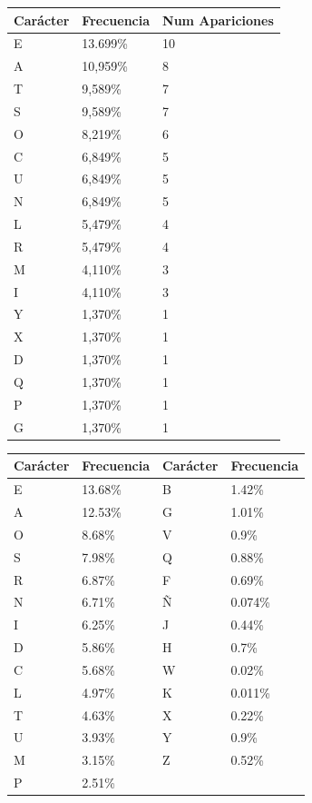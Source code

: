 \documentclass{article}
\begin{document}
\begin{enumerate}
\begin{tabular}{|l|l|l|}
\hline 
Carácter & Frecuencia & Num Apariciones \\ \hline 
E & 13.699\% & 10 \\ \hline
A & 10,959\% & 8 \\ \hline
T & 9,589\% & 7 \\ \hline
S & 9,589\% & 7 \\ \hline
O & 8,219\% & 6 \\ \hline
C & 6,849\% & 5 \\ \hline
U & 6,849\% & 5 \\ \hline
N & 6,849\% & 5 \\ \hline
L & 5,479\% & 4 \\ \hline
R & 5,479\% & 4 \\ \hline
M & 4,110\% & 3 \\ \hline
I & 4,110\% & 3 \\ \hline
Y & 1,370\% & 1 \\ \hline
X & 1,370\% & 1 \\ \hline
D & 1,370\% & 1 \\ \hline
Q & 1,370\% & 1 \\ \hline
P & 1,370\% & 1 \\ \hline
G & 1,370\% & 1 \\ 
\hline
\end{tabular}
\label{tabla:sencilla}



\begin{tabular}{|l|l|l|l|}
\hline 
Carácter & Frecuencia & Carácter & Frecuencia \\ \hline
E & 13.68\% & B & 1.42\% \\ \hline
A & 12.53\% & G & 1.01\% \\ \hline
O & 8.68\% & V & 0.9\% \\ \hline
S & 7.98\% & Q & 0.88\% \\ \hline
R & 6.87\% & F & 0.69\% \\ \hline
N & 6.71\% & Ñ & 0.074\% \\ \hline
I & 6.25\% & J & 0.44\% \\ \hline
D & 5.86\% & H & 0.7\% \\ \hline
C & 5.68\% & W & 0.02\% \\ \hline
L & 4.97\% & K & 0.011\% \\ \hline
T & 4.63\% & X & 0.22\% \\ \hline
U & 3.93\% & Y & 0.9\% \\ \hline
M & 3.15\% & Z & 0.52\% \\ \hline
P & 2.51\%  & &  \\ \hline
\end{tabular}
\label{tabla:sencilla}



\end{enumerate}
\end{document}
